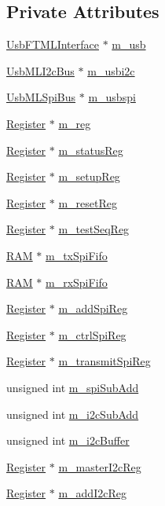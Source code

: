 \subsection*{Private Attributes}
\begin{DoxyCompactItemize}
\item 
\hyperlink{classUsbFTMLInterface}{UsbFTMLInterface} $\ast$ \hyperlink{classSeqPGA_a3df81bbe0e75a1287aa6fe9d33ea27f5}{m\_\-usb}
\item 
\hyperlink{classUsbMLI2cBus}{UsbMLI2cBus} $\ast$ \hyperlink{classSeqPGA_a31d692cdc2f70dfd71671f3e2d688e20}{m\_\-usbi2c}
\item 
\hyperlink{classUsbMLSpiBus}{UsbMLSpiBus} $\ast$ \hyperlink{classSeqPGA_aeb7d559e042bced959366125781cef39}{m\_\-usbspi}
\item 
\hyperlink{classRegister}{Register} $\ast$ \hyperlink{classSeqPGA_afd827f1d3d55b0a8efafbd79a8c54a52}{m\_\-reg}
\item 
\hyperlink{classRegister}{Register} $\ast$ \hyperlink{classSeqPGA_ae39eb15fbde7a4a48376c8cbdbbceeaa}{m\_\-statusReg}
\item 
\hyperlink{classRegister}{Register} $\ast$ \hyperlink{classSeqPGA_a03269241e7fc26493cd0595beda334c2}{m\_\-setupReg}
\item 
\hyperlink{classRegister}{Register} $\ast$ \hyperlink{classSeqPGA_a8c519e98b992ab872622e95dae4461d8}{m\_\-resetReg}
\item 
\hyperlink{classRegister}{Register} $\ast$ \hyperlink{classSeqPGA_a7478537516c951a4d08f23b0789ed6d9}{m\_\-testSeqReg}
\item 
\hyperlink{classRAM}{RAM} $\ast$ \hyperlink{classSeqPGA_a6fbdd81928bb5d0fcd671ae2facaef11}{m\_\-txSpiFifo}
\item 
\hyperlink{classRAM}{RAM} $\ast$ \hyperlink{classSeqPGA_a8ebfe7863e10ab540b5ebecb7655a0d5}{m\_\-rxSpiFifo}
\item 
\hyperlink{classRegister}{Register} $\ast$ \hyperlink{classSeqPGA_af31d87ad56c501584ccb9c60776a1289}{m\_\-addSpiReg}
\item 
\hyperlink{classRegister}{Register} $\ast$ \hyperlink{classSeqPGA_ab6597288860f5172540059345256f9a9}{m\_\-ctrlSpiReg}
\item 
\hyperlink{classRegister}{Register} $\ast$ \hyperlink{classSeqPGA_a4e0ffb37b1cd947d389354ac25723ab8}{m\_\-transmitSpiReg}
\item 
unsigned int \hyperlink{classSeqPGA_afd5442d9b92f9b59bd553df9bd91dd87}{m\_\-spiSubAdd}
\item 
unsigned int \hyperlink{classSeqPGA_a82bda98edb9681aff47733e83ac8bc4f}{m\_\-i2cSubAdd}
\item 
unsigned int \hyperlink{classSeqPGA_afcef519379e9c6ba624ba58a4eac79f1}{m\_\-i2cBuffer}
\item 
\hyperlink{classRegister}{Register} $\ast$ \hyperlink{classSeqPGA_a942c71b33a4f43b7a994cb9216abb17e}{m\_\-masterI2cReg}
\item 
\hyperlink{classRegister}{Register} $\ast$ \hyperlink{classSeqPGA_ac3a6aad3fec65ceb78528b6d20deeb3f}{m\_\-addI2cReg}
\end{DoxyCompactItemize}


